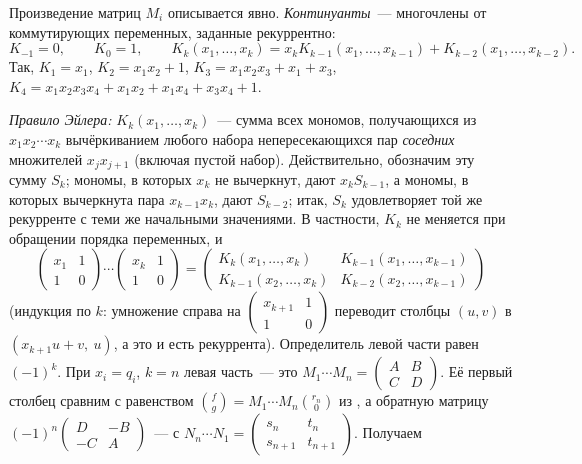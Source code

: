 \begin{aside}[1.8e: континуанты]
Произведение матриц $M_i$ описывается явно. \emph{Континуанты}~--- многочлены от коммутирующих переменных, заданные
рекуррентно:
\[
K_{-1}=0,\qquad K_0=1,\qquad K_k(x_1,\dots,x_k)=x_kK_{k-1}(x_1,\dots,x_{k-1})+K_{k-2}(x_1,\dots,x_{k-2}).
\]
Так, $K_1=x_1$, $K_2=x_1x_2+1$, $K_3=x_1x_2x_3+x_1+x_3$, $K_4=x_1x_2x_3x_4+x_1x_2+x_1x_4+x_3x_4+1$.

\emph{Правило Эйлера:} $K_k(x_1,\dots,x_k)$~--- сумма всех мономов, получающихся из $x_1x_2\cdots x_k$ вычёркиванием
любого набора непересекающихся пар \emph{соседних} множителей $x_jx_{j+1}$ (включая пустой набор). Действительно, обозначим
эту сумму $S_k$; мономы, в которых $x_k$ не вычеркнут, дают $x_kS_{k-1}$, а мономы, в которых вычеркнута пара
$x_{k-1}x_k$, дают $S_{k-2}$; итак, $S_k$ удовлетворяет той же рекурренте с теми же начальными значениями. В частности,
$K_k$ не меняется при обращении порядка переменных, и
\[
\begin{pmatrix}x_1&1\\1&0\end{pmatrix}\cdots\begin{pmatrix}x_k&1\\1&0\end{pmatrix}
=\begin{pmatrix}K_k(x_1,\dots,x_k)&K_{k-1}(x_1,\dots,x_{k-1})\\ K_{k-1}(x_2,\dots,x_k)&K_{k-2}(x_2,\dots,x_{k-1})\end{pmatrix}
\]
(индукция по $k$: умножение справа на $\left(\begin{smallmatrix}x_{k+1}&1\\1&0\end{smallmatrix}\right)$ переводит столбцы
$(u,v)$ в $(x_{k+1}u+v,\ u)$, а это и есть рекуррента). Определитель левой части равен $(-1)^k$. При $x_i=q_i$, $k=n$
левая часть~--- это $M_1\cdots M_n=\left(\begin{smallmatrix}A&B\\C&D\end{smallmatrix}\right)$. Её первый столбец сравним с
равенством $\binom fg=M_1\cdots M_n\binom{r_n}0$ из , а обратную матрицу
$(-1)^n\left(\begin{smallmatrix}D&-B\\-C&A\end{smallmatrix}\right)$~--- с $N_n\cdots N_1=\left(\begin{smallmatrix}s_n&t_n\\
s_{n+1}&t_{n+1}\end{smallmatrix}\right)$. Получаем

\end{aside}

